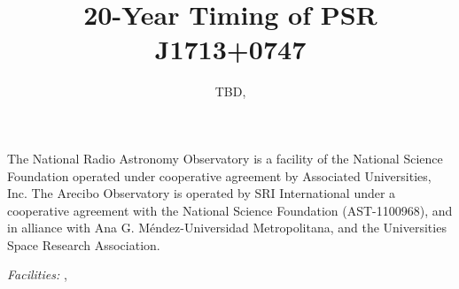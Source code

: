 \documentclass[12pt,preprint]{aastex}
\begin{document}
\title{20-Year Timing of PSR J1713+0747}

\author{%
TBD,
}







\acknowledgements

The National Radio Astronomy Observatory is a facility of the National Science
Foundation operated under cooperative agreement by Associated Universities,
Inc.
The Arecibo Observatory is operated by SRI International under a cooperative
agreement with the National Science Foundation (AST-1100968), and in alliance
with Ana G. Méndez-Universidad Metropolitana, and the Universities Space
Research Association.

{\it Facilities:}
, 

%


\end{document}
